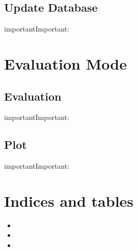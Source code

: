 \documentclass[letterpaper,10pt,english]{sphinxmanual}
\begin{document}
\section{Update Database}
\label{\detokenize{Update_Database:update-database}}\label{\detokenize{Update_Database::doc}}
\begin{sphinxadmonition}{important}{Important:}
\end{sphinxadmonition}


\chapter{Evaluation Mode}
\label{\detokenize{index:demo}}\label{\detokenize{index:evaluation-mode}}

\section{Evaluation}
\label{\detokenize{Evaluation:evaluation}}\label{\detokenize{Evaluation::doc}}
\begin{sphinxadmonition}{important}{Important:}
\end{sphinxadmonition}


\section{Plot}
\label{\detokenize{Plot:plot}}\label{\detokenize{Plot::doc}}
\begin{sphinxadmonition}{important}{Important:}
\end{sphinxadmonition}


\chapter{Indices and tables}
\label{\detokenize{index:indices-and-tables}}\begin{itemize}
\item {} 

\item {} 

\item {} 

\end{itemize}

\end{document}
